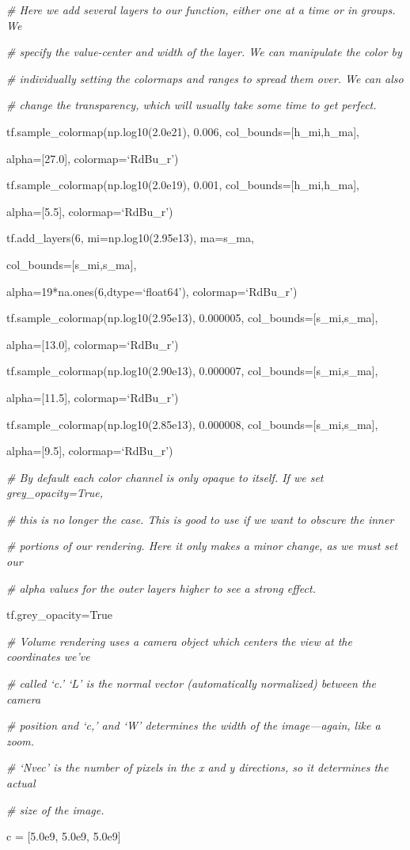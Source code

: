 {\it\# Here we add several layers to our function, either one at a time or in groups. We}
{\setlength{\parskip}{0pt}

{\it\# specify the value-center and width of the layer. We can manipulate the color by}

{\it\# individually setting the colormaps and ranges to spread them over. We can also}

{\it\# change the transparency, which will usually take some time to get perfect.}

tf.sample\_colormap(np.log10(2.0e21), 0.006, col\_bounds=[h\_mi,h\_ma],
}

{\setlength{\parindent}{96pt}alpha=[27.0], colormap=`RdBu\_r')}

tf.sample\_colormap(np.log10(2.0e19), 0.001, col\_bounds=[h\_mi,h\_ma],

{\setlength{\parindent}{96pt}alpha=[5.5], colormap=`RdBu\_r')}

tf.add\_layers(6, mi=np.log10(2.95e13), ma=s\_ma,

{\setlength{\parindent}{63.5pt}col\_bounds=[s\_mi,s\_ma],}

{\setlength{\parindent}{63.5pt}alpha=19*na.ones(6,dtype=`float64'), colormap=`RdBu\_r')}

tf.sample\_colormap(np.log10(2.95e13), 0.000005, col\_bounds=[s\_mi,s\_ma],

{\setlength{\parindent}{96pt}alpha=[13.0], colormap=`RdBu\_r')}

tf.sample\_colormap(np.log10(2.90e13), 0.000007, col\_bounds=[s\_mi,s\_ma],

{\setlength{\parindent}{96pt}alpha=[11.5], colormap=`RdBu\_r')}

tf.sample\_colormap(np.log10(2.85e13), 0.000008, col\_bounds=[s\_mi,s\_ma],

{\setlength{\parindent}{96pt}alpha=[9.5], colormap=`RdBu\_r')}

{\it\# By default each color channel is only opaque to itself. If  we set grey\_opacity=True,}
{\setlength{\parskip}{0pt}

{\it\# this is no longer the case. This is good to use if we want to obscure the inner}

{\it\# portions of our rendering. Here it only makes a minor change, as we must set our}

{\it\# alpha values for the outer layers higher to see a strong effect.}

tf.grey\_opacity=True
}

{\it\# Volume rendering uses a camera object which centers the view at the coordinates we've}
{\setlength{\parskip}{0pt}

{\it\# called `c.' `L' is the normal vector (automatically normalized) between the camera}

{\it\# position and `c,' and `W' determines the width of the image---again, like a zoom.}

{\it\# `Nvec' is the number of pixels in the x and y directions, so it determines the actual} 

{\it\# size of the image.}

c = [5.0e9, 5.0e9, 5.0e9]
}

